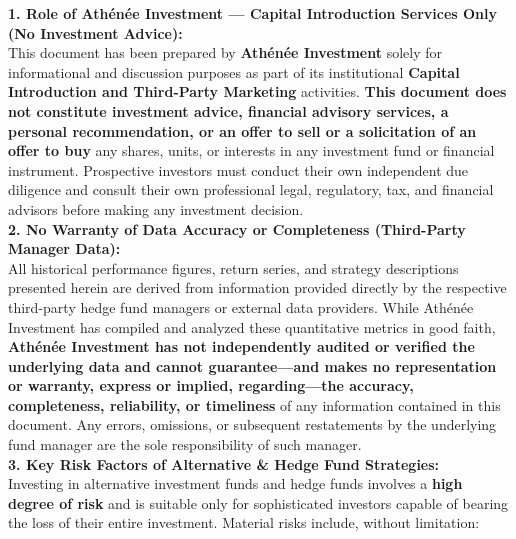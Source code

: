 \documentclass[10pt,a4paper]{article}
\begin{document}
\begin{tcolorbox}[colback=white, colframe=accent, title=\textbf{\small\strut Important Legal Disclaimer, Risk Disclosures \& Capital Introduction Notice}, fonttitle=\sffamily\bfseries\small, arc=5pt, boxrule=0.9pt, toptitle=4.5pt, bottomtitle=4.5pt, left=8pt, right=8pt, top=4.5pt, bottom=4.5pt, colbacktitle=accent]
\scriptsize
\textcolor{primary}{
\textbf{1. Role of Ath\'en\'ee Investment — Capital Introduction Services Only (No Investment Advice):}\\[1.5pt]
This document has been prepared by \textbf{Ath\'en\'ee Investment} solely for informational and discussion purposes as part of its institutional \textbf{Capital Introduction and Third-Party Marketing} activities. \textbf{This document does not constitute investment advice, financial advisory services, a personal recommendation, or an offer to sell or a solicitation of an offer to buy} any shares, units, or interests in any investment fund or financial instrument. Prospective investors must conduct their own independent due diligence and consult their own professional legal, regulatory, tax, and financial advisors before making any investment decision.\\[4.5pt]
\textbf{2. No Warranty of Data Accuracy or Completeness (Third-Party Manager Data):}\\[1.5pt]
All historical performance figures, return series, and strategy descriptions presented herein are derived from information provided directly by the respective third-party hedge fund managers or external data providers. While Ath\'en\'ee Investment has compiled and analyzed these quantitative metrics in good faith, \textbf{Ath\'en\'ee Investment has not independently audited or verified the underlying data and cannot guarantee—and makes no representation or warranty, express or implied, regarding—the accuracy, completeness, reliability, or timeliness} of any information contained in this document. Any errors, omissions, or subsequent restatements by the underlying fund manager are the sole responsibility of such manager.\\[4.5pt]
\textbf{3. Key Risk Factors of Alternative \& Hedge Fund Strategies:}\\[1.5pt]
Investing in alternative investment funds and hedge funds involves a \textbf{high degree of risk} and is suitable only for sophisticated investors capable of bearing the loss of their entire investment. Material risks include, without limitation:
}
\end{tcolorbox}
\end{document}
